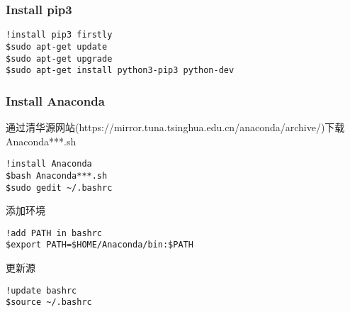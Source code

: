 \documentclass{hmj}
\begin{document}
\subsubsection{Install pip3}
\begin{lstlisting}
!install pip3 firstly
$sudo apt-get update
$sudo apt-get upgrade
$sudo apt-get install python3-pip3 python-dev
\end{lstlisting}
\subsubsection{Install Anaconda}
通过清华源网站({\color{red}https://mirror.tuna.tsinghua.edu.cn/anaconda/archive/})下载Anaconda***.sh
\begin{lstlisting}
!install Anaconda
$bash Anaconda***.sh
$sudo gedit ~/.bashrc
\end{lstlisting}
添加环境
\begin{lstlisting}
!add PATH in bashrc
$export PATH=$HOME/Anaconda/bin:$PATH
\end{lstlisting}
更新源
\begin{lstlisting}
!update bashrc 
$source ~/.bashrc
\end{lstlisting}
\end{document}
